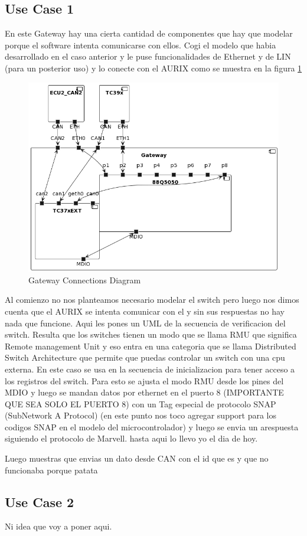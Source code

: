 \subsection{Use Case 1}
En este Gateway hay una cierta cantidad de componentes que hay que modelar porque el software intenta comunicarse con ellos. Cogi el modelo que habia desarrollado en el caso anterior y le puse funcionalidades de Ethernet y de LIN (para un posterior uso) y lo conecte con el AURIX como se muestra en la figura \ref{fig:connections-diagram}

\begin{figure}[!htb]
 \centering
 \includegraphics[width=\textwidth]{img/GWConnectionsDiagram.png}
 \caption{Gateway Connections Diagram}
 \label{fig:connections-diagram}
\end{figure}

Al comienzo no nos planteamos necesario modelar el switch pero luego nos dimos cuenta que el AURIX se intenta comunicar con el y sin sus respuestas no hay nada que funcione. Aqui les pones un UML de la secuencia de verificacion del switch. Resulta que los switches tienen un modo que se llama RMU que significa Remote management Unit y eso entra en una categoria que se llama Distributed Switch Architecture que permite que puedas controlar un switch con una cpu externa. En este caso se usa en la secuencia de inicializacion para tener acceso a los registros del switch. Para esto se ajusta el modo RMU desde los pines del MDIO y luego se mandan datos por ethernet en el puerto 8 (IMPORTANTE QUE SEA SOLO EL PUERTO 8) con un Tag especial de protocolo SNAP (SubNetwork A Protocol) (en este punto nos toco agregar support para los codigos SNAP en el modelo del microcontrolador) y luego se envia un arespuesta siguiendo el protocolo de Marvell. hasta aqui lo llevo yo el dia de hoy.

Luego muestras que envias un dato desde CAN con el id que es y que no funcionaba porque patata

\subsection{Use Case 2}

Ni idea que voy a poner aqui.